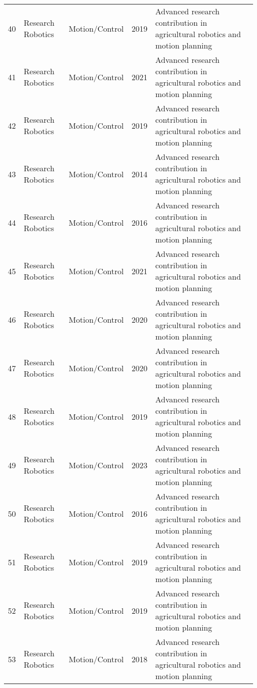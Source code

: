 \begin{table*}[htbp]
\begin{tabular}{p{}p{}p{}p{}p{}p{}}
 40 & Research Robotics & Motion/Control & 2019 & Advanced research contribution in agricultural robotics and motion planning & \cite{mark2019ethics} \\
 41 & Research Robotics & Motion/Control & 2021 & Advanced research contribution in agricultural robotics and motion planning & \cite{martos2021ensuring} \\
 42 & Research Robotics & Motion/Control & 2019 & Advanced research contribution in agricultural robotics and motion planning & \cite{mavridou2019machine} \\
 43 & Research Robotics & Motion/Control & 2014 & Advanced research contribution in agricultural robotics and motion planning & \cite{mehta2014vision} \\
 44 & Research Robotics & Motion/Control & 2016 & Advanced research contribution in agricultural robotics and motion planning & \cite{mendes2016vine} \\
 45 & Research Robotics & Motion/Control & 2021 & Advanced research contribution in agricultural robotics and motion planning & \cite{mohamed2021smart} \\
 46 & Research Robotics & Motion/Control & 2020 & Advanced research contribution in agricultural robotics and motion planning & \cite{mu2020design} \\
 47 & Research Robotics & Motion/Control & 2020 & Advanced research contribution in agricultural robotics and motion planning & \cite{mu2020intact} \\
 48 & Research Robotics & Motion/Control & 2019 & Advanced research contribution in agricultural robotics and motion planning & \cite{napoli2019phytoextraction} \\
 49 & Research Robotics & Motion/Control & 2023 & Advanced research contribution in agricultural robotics and motion planning & \cite{Ng:2023_iot} \\
 50 & Research Robotics & Motion/Control & 2016 & Advanced research contribution in agricultural robotics and motion planning & \cite{nguyen2016detection} \\
 51 & Research Robotics & Motion/Control & 2019 & Advanced research contribution in agricultural robotics and motion planning & \cite{onishi2019automated} \\
 52 & Research Robotics & Motion/Control & 2019 & Advanced research contribution in agricultural robotics and motion planning & \cite{pereira2019deep} \\
 53 & Research Robotics & Motion/Control & 2018 & Advanced research contribution in agricultural robotics and motion planning & \cite{perez2018pattern} \\

\end{tabular}
\end{table*}
